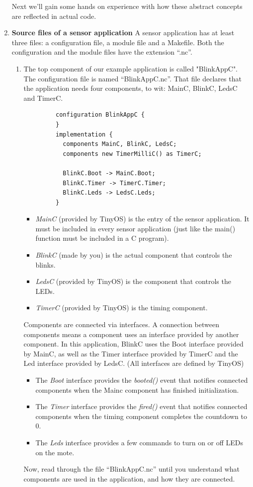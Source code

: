 \documentclass[letterpaper,12pt]{article}
\begin{document}
\begin{enumerate}
    Next we'll gain some hands on experience with how these abstract concepts
    are reflected in actual code.

\item \textbf{Source files of a sensor application}
   A sensor application has at least three files: a configuration file, a module file and a Makefile.
   Both the configuration and the module files have the extension “.nc”.

   \begin{enumerate}
      \item The top component of our example application is called "BlinkAppC".
         The configuration file is named “BlinkAppC.nc”. That file declares that the application needs four components, to wit: MainC, BlinkC, LedsC and TimerC.
         \begin{lstlisting}
         configuration BlinkAppC {
         }
         implementation {
           components MainC, BlinkC, LedsC;
           components new TimerMilliC() as TimerC;

           BlinkC.Boot -> MainC.Boot;
           BlinkC.Timer -> TimerC.Timer;
           BlinkC.Leds -> LedsC.Leds;
         }
         \end{lstlisting}
         \begin{itemize}
             \item \emph{MainC} (provided by TinyOS) is the entry of the sensor application. It must be included in every sensor application (just like the main() function must be included in a C program).
             \item \emph{BlinkC} (made by you) is the actual component that controls the blinks.
             \item \emph{LedsC} (provided by TinyOS) is the component that controls the LEDs.
             \item \emph{TimerC} (provided by TinyOS) is the timing component.
         \end{itemize}
         Components are connected via interfaces. A connection between components means a component uses an interface provided by another component.
         In this application, BlinkC uses the Boot interface provided by MainC, as well as the Timer interface provided by TimerC and the Led interface provided by LedsC. (All interfaces are defined by TinyOS)
         \begin{itemize}
            \item The \emph{Boot} interface provides the \emph{booted()} event that notifies connected components when the Mainc component has finished initialization.
            \item The \emph{Timer} interface provides the \emph{fired()} event that notifies connected components when the timing component completes the countdown to 0.
            \item The \emph{Leds} interface provides a few commands to turn on or off LEDs on the mote.
         \end{itemize}
         Now, read through the file “BlinkAppC.nc” until you understand what components are used in the application, and how they are connected.


\end{enumerate}
\end{enumerate}
\end{document}

